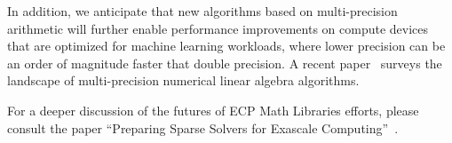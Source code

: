 In addition, we anticipate that new algorithms based on multi-precision arithmetic will further enable performance improvements on compute devices that are optimized for machine learning workloads,
where lower precision can be an order of magnitude faster that double precision.
A recent paper~\cite{Anztetal2020} surveys the landscape of multi-precision numerical
linear algebra algorithms.

For a deeper discussion of the futures of ECP Math Libraries efforts, please consult the paper ``Preparing Sparse Solvers for Exascale Computing''~\cite{ECP-Solvers}.
